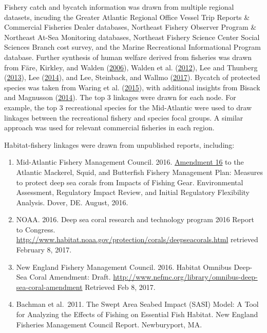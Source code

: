 \documentclass[
]{book}
\begin{document}
Fishery catch and bycatch information was drawn from multiple regional datasets, incuding the Greater Atlantic Regional Office Vessel Trip Reports \& Commercial Fisheries Dealer databases, Northeast Fishery Observer Program \& Northeast At-Sea Monitoring databases, Northeast Fishery Science Center Social Sciences Branch cost survey, and the Marine Recreational Informational Program database. Further synthesis of human welfare derived from fisheries was drawn from Färe, Kirkley, and Walden (\protect\hyperlink{ref-fare_adjusting_2006}{2006}), Walden et al. (\protect\hyperlink{ref-walden_productivity_2012}{2012}), Lee and Thunberg (\protect\hyperlink{ref-lee_inverse_2013}{2013}), Lee (\protect\hyperlink{ref-lee_hedonic_2014}{2014}), and Lee, Steinback, and Wallmo (\protect\hyperlink{ref-lee_applying_2017}{2017}). Bycatch of protected species was taken from Waring et al. (\protect\hyperlink{ref-waring_us_2015}{2015}), with additional insights from Bisack and Magnusson (\protect\hyperlink{ref-bisack_measuring_2014}{2014}). The top 3 linkages were drawn for each node. For example, the top 3 recreational species for the Mid-Atlantic were used to draw linkages between the recreational fishery and species focal groups. A similar approach was used for relevant commercial fisheries in each region.

Habitat-fishery linkages were drawn from unpublished reports, including:

\begin{enumerate}
\def\labelenumi{\arabic{enumi}.}
\item
  Mid-Atlantic Fishery Management Council. 2016. \href{http://www.mafmc.org/actions/msb-am16}{Amendment 16} to the Atlantic Mackerel, Squid, and Butterfish Fishery Management Plan: Measures to protect deep sea corals from Impacts of Fishing Gear. Environmental Assessment, Regulatory Impact Review, and Initial Regulatory Flexibility Analysis. Dover, DE. August, 2016.
\item
  NOAA. 2016. Deep sea coral research and technology program 2016 Report to Congress. \url{http://www.habitat.noaa.gov/protection/corals/deepseacorals.html} retrieved February 8, 2017.
\item
  New England Fishery Management Council. 2016. Habitat Omnibus Deep-Sea Coral Amendment: Draft. \url{http://www.nefmc.org/library/omnibus-deep-sea-coral-amendment} Retrieved Feb 8, 2017.
\item
  Bachman et al.~2011. The Swept Area Seabed Impact (SASI) Model: A Tool for Analyzing the Effects of Fishing on Essential Fish Habitat. New England Fisheries Management Council Report. Newburyport, MA.
\end{enumerate}
\end{document}
